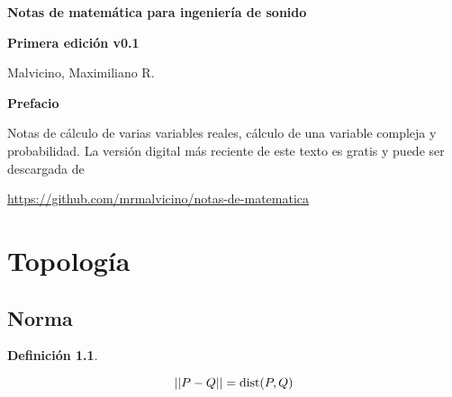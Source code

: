 \documentclass[a5paper,12pt,twoside]{book}
\newtheorem{defn}{{Definición}}[chapter]
\begin{document}
\pagestyle{fancy}
\fancyhf{}
\chead{\scriptsize \nouppercase\rightmark}
\cfoot{\scriptsize \thepage}
\renewcommand{\headrulewidth}{0pt}

\frontmatter
%

\begin{center}

    \begin{Huge}
    \textbf{Notas de matemática para ingeniería de sonido}
    \end{Huge}

    \vspace{1cm}
    \textbf{Primera edición v0.1}
    \vspace{2cm}

    \begin{Large}
        Malvicino, Maximiliano R.
    \end{Large}

\end{center}

\clearpage
\noindent
\textbf{Prefacio}

Notas de cálculo de varias variables reales, cálculo de una variable compleja y probabilidad.
La versión digital más reciente de este texto es gratis y puede ser descargada de
\begin{center}
    \small
    \url{https://github.com/mrmalvicino/notas-de-matematica}
\end{center}

\renewcommand{\spanishappendixname}{Anexo}
\tableofcontents

\mainmatter
{}


\chapter{Topología}


\section{Norma}

\begin{mdframed}[style=MyFrame1]
    \begin{defn}
    \end{defn}
    \begin{equation*}
        {\left|\left| {P-Q} \right|\right|} = \operatorname{dist} (P,Q)
    \end{equation*}
\end{mdframed}
\end{document}
